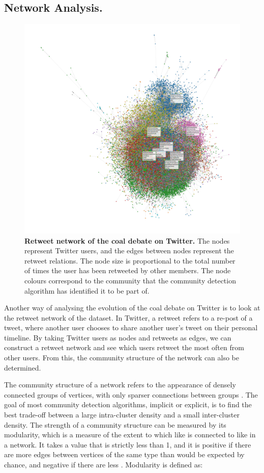 \documentclass[12pt,onecolumn,twoside]{layout}
\begin{document}
\subsection*{Network Analysis.}
\begin{figure}
	\begin{center}
		\includegraphics[width=0.8\linewidth]{figures/rt_network_ht2}
	\end{center}
	\caption{\textbf{Retweet network of the coal debate on Twitter.} The nodes represent Twitter users, and the edges between nodes represent the retweet relations. The node size is proportional to the total number of times the user has been retweeted by other members. The node colours correspond to the community that the community detection algorithm has identified it to be part of.}
	\label{fig:rt_network}
\end{figure}

Another way of analysing the evolution of the coal debate on Twitter is to look at the retweet network of the dataset. In Twitter, a retweet refers to a re-post of a tweet, where another user chooses to share another user's tweet on their personal timeline. By taking Twitter users as nodes and retweets as edges, we can construct a retweet network and see which users retweet the most often from other users. From this, the community structure of the network can also be determined.

The community structure of a network refers to the appearance of densely connected groups of vertices, with only sparser connections between groups \citep{Newman8577}. The goal of most community detection algorithms, implicit or explicit, is to find the best trade-off between a large intra-cluster density and a small inter-cluster density. The strength of a community structure can be measured by its modularity, which is a measure of the extent to which like is connected to like in a network. It takes a value that is strictly less than 1, and it is positive if there are more edges between vertices of the same type than would be expected by chance, and negative if there are less \citep{Newman8577}. Modularity is defined as:
\end{document}

